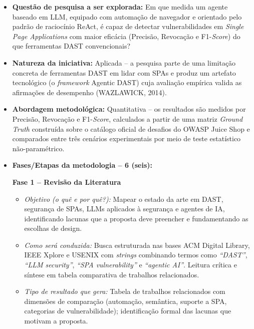 \documentclass[12pt, a4paper]{article}
\begin{document}
\begin{itemize}

  \item \textbf{Questão de pesquisa a ser explorada:}
  Em que medida um agente baseado em LLM, equipado com automação de navegador e orientado pelo padrão de raciocínio ReAct, é capaz de detectar vulnerabilidades em \textit{Single Page Applications} com maior eficácia (Precisão, Revocação e F1-\textit{Score}) do que ferramentas DAST convencionais?

  \item \textbf{Natureza da iniciativa:} Aplicada -- a pesquisa parte de uma limitação concreta de ferramentas DAST em lidar com SPAs e produz um artefato tecnológico (o \textit{framework} Agentic DAST) cuja avaliação empírica valida as afirmações de desempenho (WAZLAWICK, 2014).

  \item \textbf{Abordagem metodológica:} Quantitativa -- os resultados são medidos por Precisão, Revocação e F1-\textit{Score}, calculados a partir de uma matriz \textit{Ground Truth} construída sobre o catálogo oficial de desafios do OWASP Juice Shop e comparados entre três cenários experimentais por meio de teste estatístico não-paramétrico.

  \item \textbf{Fases/Etapas da metodologia -- 6 (seis):}

  \vspace{0.5em}

  \textbf{Fase 1 -- Revisão da Literatura}
  \begin{itemize}
    \item \textit{Objetivo (o quê e por quê?):} Mapear o estado da arte em DAST, segurança de SPAs, LLMs aplicados à segurança e agentes de IA, identificando lacunas que a proposta deve preencher e fundamentando as escolhas de design.
    \item \textit{Como será conduzida:} Busca estruturada nas bases ACM Digital Library, IEEE Xplore e USENIX com \textit{strings} combinando termos como \textit{``DAST''}, \textit{``LLM security''}, \textit{``SPA vulnerability''} e \textit{``agentic AI''}. Leitura crítica e síntese em tabela comparativa de trabalhos relacionados.
    \item \textit{Tipo de resultado que gera:} Tabela de trabalhos relacionados com dimensões de comparação (automação, semântica, suporte a SPA, categorias de vulnerabilidade); identificação formal das lacunas que motivam a proposta.
  \end{itemize}


\end{itemize}
\end{document}
